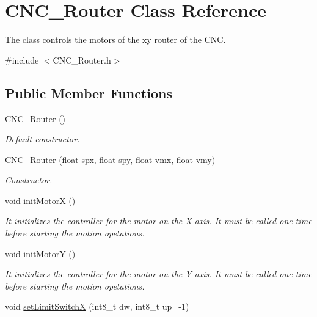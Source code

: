 \hypertarget{class_c_n_c___router}{\section{C\+N\+C\+\_\+\+Router Class Reference}
\label{class_c_n_c___router}
}


The class controls the motors of the xy router of the C\+N\+C.  




{\ttfamily \#include $<$C\+N\+C\+\_\+\+Router.\+h$>$}

\subsection*{Public Member Functions}
\begin{DoxyCompactItemize}
\item 
\hyperlink{class_c_n_c___router_a2286f545f42ff5febfdb8d52782cd0da}{C\+N\+C\+\_\+\+Router} ()
\begin{DoxyCompactList}\small\item\em Default constructor. \end{DoxyCompactList}\item 
\hyperlink{class_c_n_c___router_a928dbfed47e8514928b92559372378f0}{C\+N\+C\+\_\+\+Router} (float spx, float spy, float vmx, float vmy)
\begin{DoxyCompactList}\small\item\em Constructor. \end{DoxyCompactList}\item 
void \hyperlink{class_c_n_c___router_a89f4cbde58844154f247d2bf02a167fb}{init\+Motor\+X} ()
\begin{DoxyCompactList}\small\item\em It initializes the controller for the motor on the X-\/axis. It must be called one time before starting the motion opetations. \end{DoxyCompactList}\item 
void \hyperlink{class_c_n_c___router_a7f13e636e4b92c5547995b653cea317e}{init\+Motor\+Y} ()
\begin{DoxyCompactList}\small\item\em It initializes the controller for the motor on the Y-\/axis. It must be called one time before starting the motion opetations. \end{DoxyCompactList}\item 
void \hyperlink{class_c_n_c___router_a0d1313b481b864a85758aaeab61e6595}{set\+Limit\+Switch\+X} (int8\+\_\+t dw, int8\+\_\+t up=-\/1)

\end{DoxyCompactItemize}
